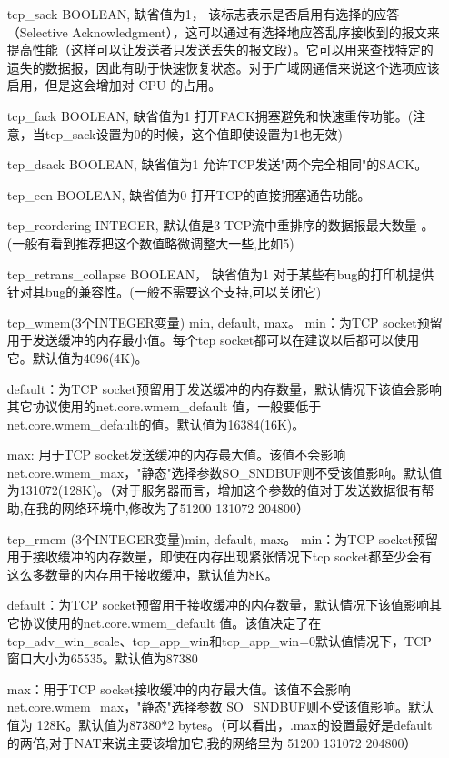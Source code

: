 \begin{enumerate}
\item[tcp\_sack] BOOLEAN,
                缺省值为1，
                该标志表示是否启用有选择的应答（Selective Acknowledgment），这可以通过有选择地应答乱序接收到的报文来提高性能（这样可以让发送者只发送丢失的报文段）。它可以用来查找特定的遗失的数据报，因此有助于快速恢复状态。对于广域网通信来说这个选项应该启用，但是这会增加对 CPU 的占用。

\item[tcp\_fack] BOOLEAN,
缺省值为1
打开FACK拥塞避免和快速重传功能。(注意，当tcp\_sack设置为0的时候，这个值即使设置为1也无效)

\item[tcp\_dsack] BOOLEAN,
缺省值为1
允许TCP发送"两个完全相同"的SACK。

\item[tcp\_ecn] BOOLEAN,
缺省值为0
打开TCP的直接拥塞通告功能。

\item[tcp\_reordering] INTEGER,
默认值是3
TCP流中重排序的数据报最大数量 。 (一般有看到推荐把这个数值略微调整大一些,比如5)

\item[tcp\_retrans\_collapse] BOOLEAN，
缺省值为1
对于某些有bug的打印机提供针对其bug的兼容性。(一般不需要这个支持,可以关闭它)

\item[tcp\_wmem(3个INTEGER变量)] min, default, max。
min：为TCP socket预留用于发送缓冲的内存最小值。每个tcp socket都可以在建议以后都可以使用它。默认值为4096(4K)。

default：为TCP socket预留用于发送缓冲的内存数量，默认情况下该值会影响其它协议使用的net.core.wmem\_default 值，一般要低于net.core.wmem\_default的值。默认值为16384(16K)。

max: 用于TCP socket发送缓冲的内存最大值。该值不会影响net.core.wmem\_max，"静态"选择参数SO\_SNDBUF则不受该值影响。默认值为131072(128K)。（对于服务器而言，增加这个参数的值对于发送数据很有帮助,在我的网络环境中,修改为了51200 131072 204800）

\item[tcp\_rmem ] (3个INTEGER变量)min, default, max。
min：为TCP socket预留用于接收缓冲的内存数量，即使在内存出现紧张情况下tcp socket都至少会有这么多数量的内存用于接收缓冲，默认值为8K。

default：为TCP socket预留用于接收缓冲的内存数量，默认情况下该值影响其它协议使用的net.core.wmem\_default 值。该值决定了在tcp\_adv\_win\_scale、tcp\_app\_win和tcp\_app\_win=0默认值情况下，TCP窗口大小为65535。默认值为87380

max：用于TCP socket接收缓冲的内存最大值。该值不会影响 net.core.wmem\_max，"静态"选择参数 SO\_SNDBUF则不受该值影响。默认值为 128K。默认值为87380*2 bytes。（可以看出，.max的设置最好是default的两倍,对于NAT来说主要该增加它,我的网络里为 51200 131072 204800）


\end{enumerate}
